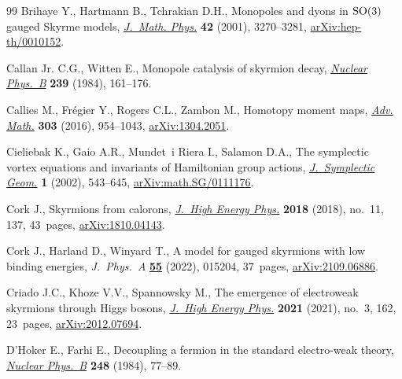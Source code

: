 \documentclass[10pt,a4paper]{amsart}
\newcommand{\1}{{\mathbb{1}}}
\numberwithin{equation}{section}
\begin{document}
\begin{thebibliography}{99}
Brihaye Y., Hartmann B., Tchrakian D.H., Monopoles and dyons in {${\rm SO}(3)$}
 gauged {S}kyrme models, \href{https://doi.org/10.1063/1.1380253}{\textit{J.~Math. Phys.}} \textbf{42} (2001),
 3270--3281, \href{https://arxiv.org/abs/hep-th/0010152}{arXiv:hep-th/0010152}.

Callan Jr. C.G., Witten E., Monopole catalysis of skyrmion decay,
 \href{https://doi.org/10.1016/0550-3213(84)90088-9}{\textit{Nuclear Phys.~B}} \textbf{239} (1984), 161--176.

Callies M., Fr\'egier Y., Rogers C.L., Zambon M., Homotopy moment maps,
 \href{https://doi.org/10.1016/j.aim.2016.08.012}{\textit{Adv. Math.}} \textbf{303} (2016), 954--1043, \href{https://arxiv.org/abs/1304.2051}{arXiv:1304.2051}.

Cieliebak K., Gaio A.R., Mundet~i Riera I., Salamon D.A., The symplectic vortex
 equations and invariants of {H}amiltonian group actions,
 \href{https://doi.org/10.4310/JSG.2001.v1.n3.a3}{\textit{J.~Symplectic Geom.}} \textbf{1} (2002), 543--645,
 \href{https://arxiv.org/abs/math.SG/0111176}{arXiv:math.SG/0111176}.

Cork J., Skyrmions from calorons, \href{https://doi.org/10.1007/jhep11(2018)137}{\textit{J.~High Energy Phys.}} \textbf{2018}
 (2018), no.~11, 137, 43~pages, \href{https://arxiv.org/abs/1810.04143}{arXiv:1810.04143}.

Cork J., Harland D., Winyard T., A model for gauged skyrmions with low binding
 energies, \textit{J.~Phys.~A} \href{https://doi.org/10.1088/1751-8121/ac3c81}{\textbf{55}} (2022), 015204, 37~pages,
 \href{https://arxiv.org/abs/2109.06886}{arXiv:2109.06886}.

Criado J.C., Khoze V.V., Spannowsky M., The emergence of electroweak skyrmions
 through {H}iggs bosons, \href{https://doi.org/10.1007/jhep03(2021)162}{\textit{J.~High Energy Phys.}} \textbf{2021} (2021),
 no.~3, 162, 23~pages, \href{https://arxiv.org/abs/2012.07694}{arXiv:2012.07694}.

D'Hoker E., Farhi E., Decoupling a fermion in the standard electro-weak theory,
 \href{https://doi.org/10.1016/0550-3213(84)90587-X}{\textit{Nuclear Phys.~B}} \textbf{248} (1984), 77--89.


\end{thebibliography}
\end{document}
